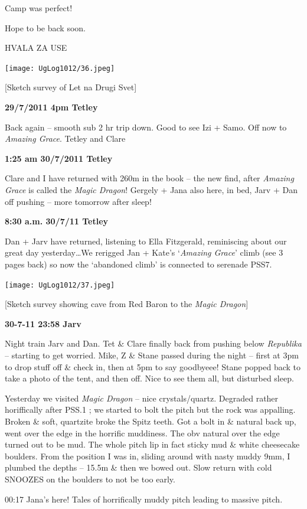 Camp was perfect!

Hope to be back soon.

HVALA ZA USE

\texttt{[image: UgLog1012/36.jpeg]}

{[}Sketch survey of Let na Drugi Svet{]}

\textbf{29/7/2011 4pm Tetley}

Back again -- smooth sub 2 hr trip down. Good to see Izi + Samo. Off now
to \emph{Amazing Grace}. Tetley and Clare

\textbf{1:25 am 30/7/2011 Tetley}

Clare and I have returned with 260m in the book -- the new find, after
\emph{Amazing Grace} is called the \emph{Magic Dragon}! Gergely + Jana
also here, in bed, Jarv + Dan off pushing -- more tomorrow after sleep!

\textbf{8:30 a.m. 30/7/11 Tetley}

Dan + Jarv have returned, listening to Ella Fitzgerald, reminiscing
about our great day yesterday\ldots{}We rerigged Jan + Kate's
`\emph{Amazing Grace}' climb (see 3 pages back) so now the `abandoned
climb' is connected to serenade PSS7.

\texttt{[image: UgLog1012/37.jpeg]}

{[}Sketch survey showing cave from Red Baron to the \emph{Magic
Dragon}{]}

\textbf{30-7-11 23:58 Jarv}

Night train Jarv and Dan. Tet \& Clare finally back from pushing below
\emph{Republika} -- starting to get worried. Mike, Z \& Stane passed
during the night -- first at 3pm to drop stuff off \& check in, then at
5pm to say goodbyeee! Stane popped back to take a photo of the tent, and
then off. Nice to see them all, but disturbed sleep.

Yesterday we visited \emph{Magic Dragon} -- nice crystals/quartz.
Degraded rather horiffically after PSS.1 ; we started to bolt the pitch
but the rock was appalling. Broken \& soft, quartzite broke the Spitz
teeth. Got a bolt in \& natural back up, went over the edge in the
horrific muddiness. The obv natural over the edge turned out to be mud.
The whole pitch lip in fact sticky mud \& white cheesecake boulders.
From the position I was in, sliding around with nasty muddy 9mm, I
plumbed the depths -- 15.5m \& then we bowed out. Slow return with cold
SNOOZES on the boulders to not be too early.

00:17 Jana's here! Tales of horrifically muddy pitch leading to massive
pitch.

